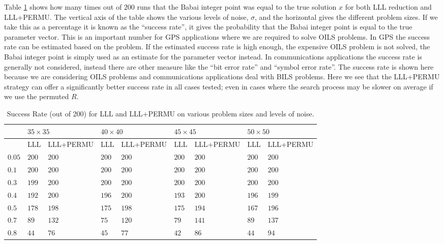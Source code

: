 \documentclass[12pt,Bold,letterpaper]{mcgilletdclass}
\begin{document}
Table \ref{tab:successRates} shows how many times out of $200$ runs that the
Babai integer point was equal to the true solution $x$ for both LLL reduction and
LLL+PERMU. The vertical axis of the table shows the various levels of noise,
$\sigma$, and the horizontal gives the different problem sizes. If we take this
as a percentage it is known as the ``success rate'', it gives the probability that the Babai integer point is equal to the true parameter vector. This is an important number for GPS applications where we are required to solve OILS problems. In GPS the success rate can be estimated based on the problem. If the estimated success rate is high enough, the expensive OILS problem is not solved, the Babai integer point is simply used as an estimate for the parameter vector instead. In communications applications the success rate is generally not considered, instead there are other measure like the ``bit error rate'' and ``symbol error rate''. The success rate is shown here because we are considering OILS problems and communications applications deal with BILS problems. Here we see that the LLL+PERMU strategy can offer a significantly better success rate in all cases tested; even in cases where the search process may be slower on average if we use the permuted $R$.

\begin{table}
\caption{Success Rate (out of 200) for LLL and LLL+PERMU on various problem
sizes and levels of noise.}
\label{tab:successRates}
\begin{tabular}{|l|l|l|l|l|l|l|l|l|}
\hline
&               \multicolumn{2}{|l|}{$35 \times 35$} & \multicolumn{2}{|l|}{$40
\times 40$} &\multicolumn{2}{|l|}{$45 \times 45$} & \multicolumn{2}{|l|}{$50
\times 50$} \\ \hline
&               LLL & LLL+PERMU & LLL & LLL+PERMU & LLL & LLL+PERMU & LLL &
LLL+PERMU \\ \hline
$0.05$&         $200$ & $200$ & $200$ & $200$ & $200$ & $200$ & $200$ & $200$ 
\\ \hline        
$0.1$&           $200$ & $200$ & $200$ & $200$ & $200$ & $200$ & $200$ & $200$
\\ \hline
$0.3$&           $199$ & $200$ & $200$ & $200$ & $200$ & $200$ & $200$ & $200$
\\ \hline
$0.4$&           $192$ & $200$ & $196$ & $200$ & $193$ & $200$ & $196$ & $199$
\\ \hline
$0.5$&           $178$ & $198$ & $175$ & $198$ & $175$ & $194$ & $167$ & $196$
\\ \hline
$0.7$&            $89$ & $132$ &  $75$ & $120$ & $79$  & $141$ & $89$  & $137$
\\ \hline
$0.8$&            $44$ &  $76$ &  $45$ &  $77$ & $42$  & $86$  & $44$  & $94$
\\ 
\hline
\end{tabular}
\end{table}
\end{document}
